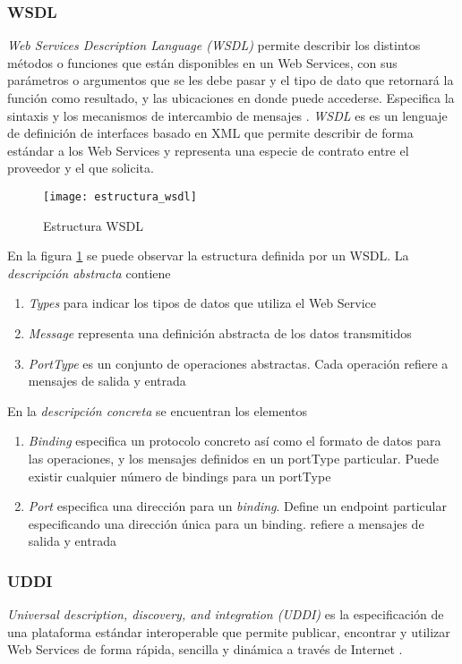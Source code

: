 \subsubsection{WSDL}
\label{MarcoConceptual:WSDL}
\emph{Web Services Description Language (WSDL)} permite describir los distintos métodos o funciones que están disponibles en un Web Services, con sus parámetros o argumentos que se les debe pasar y el tipo de dato que retornará la función como resultado, y las ubicaciones en donde puede accederse. Especifica la sintaxis y los mecanismos de intercambio de mensajes \cite{WSDL:W3C}. \emph{WSDL} es es un lenguaje de definición de interfaces basado en XML que permite describir de forma estándar a los Web Services \cite{Tesis:LauraGonzalez:PlataformaESB} y representa una especie de contrato entre el proveedor y el que solicita. 
  \begin{figure}[h]
    \centering
    \texttt{[image: estructura\_wsdl]}
    \caption{Estructura WSDL}
    \label{figura:estructura_wsdl}
  \end{figure}
En la figura \ref{figura:estructura_wsdl} se puede observar la estructura definida por un WSDL.
La \emph{descripción abstracta} contiene \cite{WSDL:W3C}
				\begin{enumerate}
				\item \emph{Types} para indicar los tipos de datos que utiliza el Web Service
				\item \emph{Message} representa una definición abstracta de los datos transmitidos
				\item \emph{PortType} es un conjunto de operaciones abstractas. Cada operación refiere a mensajes de salida y entrada
				\end{enumerate}
En la \emph{descripción concreta} se encuentran los elementos \cite{WSDL:W3C} 
				\begin{enumerate}
				\item \emph{Binding} especifica un protocolo concreto así como el formato de datos para las operaciones, y los mensajes definidos en un portType particular. Puede existir
cualquier número de bindings para un portType
				\item \emph{Port} especifica una dirección para un \emph{binding}. Define un endpoint particular especificando una dirección única para un binding. refiere a mensajes de salida y entrada
				\end{enumerate}
\subsubsection{UDDI}
\label{MarcoConceptual:UDDI}
\emph{Universal description, discovery, and integration (UDDI)} es la especificación de una
plataforma estándar interoperable que permite publicar, encontrar y utilizar Web Services
de forma rápida, sencilla y dinámica a través de Internet \cite{UDDI:def}.

